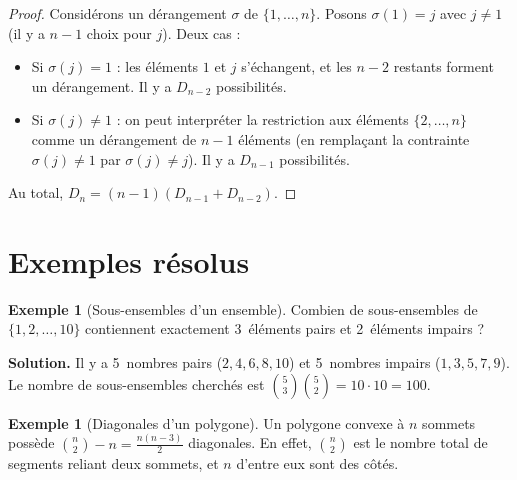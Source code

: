 \documentclass[12pt,a4paper,openany]{book}
\theoremstyle{definition}
\newtheorem{exemple}[definition]{Exemple}
\theoremstyle{plain}
\theoremstyle{remark}
\begin{document}
\begin{proof}
Considérons un dérangement $\sigma$ de $\{1,\ldots,n\}$. Posons
$\sigma(1) = j$ avec $j \neq 1$ (il y a $n-1$ choix pour $j$). Deux cas :
\begin{itemize}
  \item Si $\sigma(j) = 1$ : les éléments $1$ et $j$ s'échangent, et les
    $n-2$ restants forment un dérangement. Il y a $D_{n-2}$ possibilités.
  \item Si $\sigma(j) \neq 1$ : on peut interpréter la restriction aux
    éléments $\{2,\ldots,n\}$ comme un dérangement de $n-1$ éléments (en
    remplaçant la contrainte $\sigma(j)\neq 1$ par $\sigma(j)\neq j$). Il y
    a $D_{n-1}$ possibilités.
\end{itemize}
Au total, $D_n = (n-1)(D_{n-1} + D_{n-2})$.
\end{proof}

\section{Exemples résolus}\label{sec:exemples-denombrement}

\begin{exemple}[Sous-ensembles d'un ensemble]\label{ex:sous-ensembles-comptage}
Combien de sous-ensembles de $\{1,2,\ldots,10\}$ contiennent exactement
3~éléments pairs et 2~éléments impairs ?

\textbf{Solution.} Il y a 5~nombres pairs ($2,4,6,8,10$) et 5~nombres impairs
($1,3,5,7,9$). Le nombre de sous-ensembles cherchés est
$\binom{5}{3}\binom{5}{2} = 10 \cdot 10 = 100$.
\end{exemple}

\begin{exemple}[Diagonales d'un polygone]\label{ex:diagonales}
Un polygone convexe à $n$ sommets possède $\binom{n}{2} - n = \frac{n(n-3)}{2}$
diagonales. En effet, $\binom{n}{2}$ est le nombre total de segments reliant
deux sommets, et $n$ d'entre eux sont des côtés.
\end{exemple}
\end{document}
